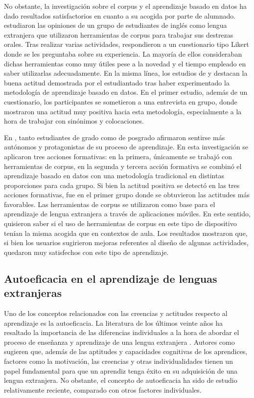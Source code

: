 No obstante, la investigación sobre el corpus y el aprendizaje basado en
datos ha dado resultados satisfactorios en cuanto a su acogida por parte
de alumnado. \textcite{geluso2014discovering} estudiaron las opiniones de un
grupo de estudiantes de inglés como lengua extranjera que utilizaron
herramientas de corpus para trabajar sus destrezas orales. Tras realizar
varias actividades, respondieron a un cuestionario tipo Likert donde se
les preguntaba sobre su experiencia. La mayoría de ellos consideraban
dichas herramientas como muy útiles pese a la novedad y el tiempo
empleado en saber utilizarlas adecuadamente. En la misma línea, los
estudios de \textcite{asik2016lexical} y \textcite{lin2016effects} destacan la buena
actitud demostrada por el estudiantado tras haber experimentado la
metodología de aprendizaje basado en datos. En el primer estudio, además
de un cuestionario, los participantes se sometieron a una entrevista en
grupo, donde mostraron una actitud muy positiva hacia esta metodología,
especialmente a la hora de trabajar con sinónimos y colocaciones.

En \textcite{lin2016effects}, tanto estudiantes de grado como de posgrado afirmaron
sentirse más autónomos y protagonistas de su proceso de aprendizaje. En
esta investigación se aplicaron tres acciones formativas: en la primera,
únicamente se trabajó con herramientas de corpus, en la segunda y
tercera acción formativa se combinó el aprendizaje basado en datos con
una metodología tradicional en distintas proporciones para cada grupo.
Si bien la actitud positiva se detectó en las tres acciones formativas,
fue en el primer grupo donde se obtuvieron las actitudes más favorables.
Las herramientas de corpus se utilizaron como base para el aprendizaje
de lengua extranjera a través de aplicaciones móviles. En este sentido,
\textcite{perezparedes2019mobile} quisieron saber si el uso de
herramientas de corpus en este tipo de dispositivo tenían la misma
acogida que en contextos de aula. Los resultados mostraron que, si bien
los usuarios sugirieron mejoras referentes al diseño de algunas
actividades, quedaron muy satisfechos con este tipo de aprendizaje.

\subsection{Autoeficacia en el aprendizaje de lenguas extranjeras}\label{sub-sec-autoeficaciaenelaprendizajedelenguas extranjeras}

Uno de los conceptos relacionados con las creencias y actitudes respecto
al aprendizaje es la autoeficacia. La literatura de los últimos veinte
años ha resaltado la importancia de las diferencias individuales a la
hora de abordar el proceso de enseñanza y aprendizaje de una lengua
extranjera \cite{chamorro2021actitudes,dornyei2019towards,munoz2019actitudes,you2016}. Autores como \textcite{dornyei2019towards} sugieren que, además de las aptitudes
y capacidades cognitivas de los aprendices, factores como la motivación,
las creencias y otras individualidades tienen un papel fundamental para
que un aprendiz tenga éxito en su adquisición de una lengua extranjera.
No obstante, el concepto de autoeficacia ha sido de estudio
relativamente reciente, comparado con otros factores individuales.

